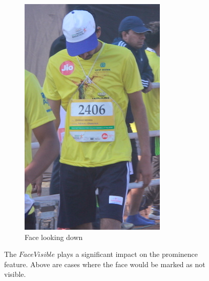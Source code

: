 \begin{figure}[p]
\begin{subfigure}[b]{0.25\textwidth}
    \includegraphics[width=\textwidth]{images/dataset/Prominence_FaceNotVisible_LookingDown}
    \caption{Face looking down}
  \end{subfigure}
  \hspace{\fill}
  \caption[Face visibility and its effect on prominence]{The $FaceVisible$ plays a significant impact on the prominence feature. Above are cases where the face would be marked as not visible.}
  \label{fig:dataset:face_prominence}
\end{figure}

